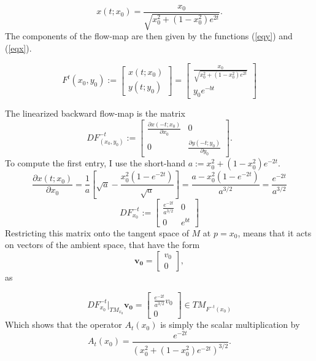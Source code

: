 \documentclass[a4paper,11pt,pdftex]{article}
\begin{document}
\begin{equation}
\label{eqx}
    x(t;x_0) = \frac{x_0}{\sqrt{x_0^2 + (1-x_0^2)e^{2t}}}.
\end{equation}
The components of the flow-map are then given by the functions (\ref{eqy}) and (\ref{eqx}). 

\begin{equation}
    F^t(x_0,y_0) := \begin{bmatrix} 
    x(t; x_0) \\
    y(t; y_0)
    \end{bmatrix} = \begin{bmatrix} 
    \frac{x_0}{\sqrt{x_0^2 + (1-x_0^2)e^{2t}}}\\
    y_0e^{-bt}
    \end{bmatrix}
\end{equation}

The linearized backward flow-map is the matrix
\begin{equation}
    DF^{-t}_{(x_0,y_0)} := \begin{bmatrix} 
    \frac{\partial x(-t; x_0)}{\partial x_0} & 0 \\
    0 & \frac{\partial y(-t;y_0)}{\partial y_0}
    \end{bmatrix}.
\end{equation}
To compute the first entry, I use the short-hand $a:=x_0^2 + (1-x_0^2)e^{-2t}$. 
$$
\frac{\partial x(t;x_0)}{\partial x_0} = \frac{1}{a}\left[\sqrt{a} - \frac{x_0^2(1-e^{-2t})}{\sqrt{a}}\right] = \frac{a - x_0^2(1-e^{-2t})}{a^{3/2}} = \frac{e^{-2t}}{a^{3/2}}
$$
\begin{equation*}
    DF^{-t}_{x_0} := \begin{bmatrix} 
    \frac{e^{-2t}}{a^{3/2}} & 0 \\
    0 & e^{bt}
    \end{bmatrix}
\end{equation*}
Restricting this matrix onto the tangent space of $M$ at $p=x_0$, means that it acts on vectors of the ambient space, that have the form
$$
\mathbf{v_0} = \begin{bmatrix}
v_0 \\
0
\end{bmatrix},
$$ as

\begin{equation*}
    DF^{-t}_{x_0}|_{TM_{x_0}} \mathbf{v_0} = \begin{bmatrix}\frac{e^{-2t}}{a^{3/2}}v_0 \\ 0 \end{bmatrix} \in TM_{F^{-t}(x_0)}
\end{equation*}
Which shows that the operator $A_t(x_0)$ is simply the scalar multiplication by
\begin{equation}
    \label{eqat}
    A_t(x_0) = \frac{e^{-2t}}{(x_0^2 + (1-x_0^2)e^{-2t})^{3/2}}.
\end{equation}
\end{document}
